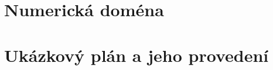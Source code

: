 \chapter{Numerická doména}
\label{app:domena}



\chapter{Ukázkový plán a jeho provedení}
\label{app:plan}
